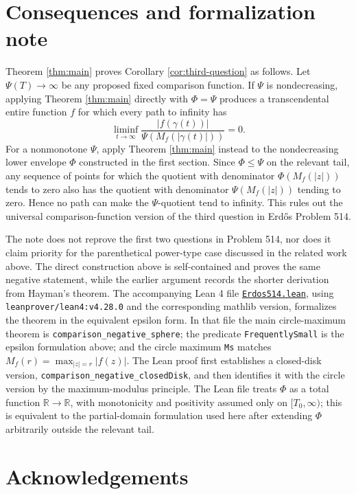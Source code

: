 \documentclass[11pt]{article}
\begin{document}
\section{Consequences and formalization note}

Theorem \ref{thm:main} proves Corollary \ref{cor:third-question} as follows.
Let \(\Psi(T)\to\infty\) be any proposed fixed comparison function.  If
\(\Psi\) is nondecreasing, applying Theorem \ref{thm:main} directly with
\(\Phi=\Psi\) produces a transcendental entire function \(f\) for which every
path to infinity has
\[
\liminf_{t\to\infty}
\frac{|f(\gamma(t))|}{\Psi(M_f(|\gamma(t)|))}=0.
\]
For a nonmonotone \(\Psi\), apply Theorem \ref{thm:main} instead to the
nondecreasing lower envelope \(\Phi\) constructed in the first section.  Since
\(\Phi\le\Psi\) on the relevant tail, any sequence of points for which the
quotient with denominator \(\Phi(M_f(|z|))\) tends to zero also has the quotient
with denominator \(\Psi(M_f(|z|))\) tending to zero.  Hence no path can make the
\(\Psi\)-quotient tend to infinity.  This rules out the universal
comparison-function version of the third question in Erd\H{o}s Problem 514.

The note does not reprove the first two questions in Problem 514, nor does it
claim priority for the parenthetical power-type case discussed in the related
work above.  The direct construction above is self-contained and proves the same
negative statement, while the earlier argument records the shorter derivation
from Hayman's theorem.  The accompanying Lean 4 file
\href{https://github.com/yuta0x89/ErdosProblems/blob/2c0cd8b821ed6ad35c715c0ed67da08bb4494789/Erdos514.lean}{\texttt{Erdos514.lean}}, using
\texttt{leanprover/lean4:v4.28.0} and the corresponding mathlib version,
formalizes the theorem in the equivalent epsilon form.  In that file the main
circle-maximum theorem is \texttt{comparison\_negative\_sphere}; the predicate
\texttt{FrequentlySmall} is the epsilon formulation above; and the circle
maximum \texttt{Ms} matches \(M_f(r)=\max_{|z|=r}|f(z)|\).  The Lean proof first
establishes a closed-disk version, \texttt{comparison\_negative\_closedDisk},
and then identifies it with the circle version by the maximum-modulus principle.
The Lean file treats \(\Phi\) as a total function \(\mathbb R\to\mathbb R\), with
monotonicity and positivity assumed only on \([T_0,\infty)\); this is equivalent
to the partial-domain formulation used here after extending \(\Phi\) arbitrarily
outside the relevant tail.

\section*{Acknowledgements}
\end{document}

